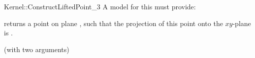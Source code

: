 \begin{ccRefFunctionObjectConcept}{Kernel::ConstructLiftedPoint_3}
A model for this must provide:


       {returns a point  on plane , such that the projection of
        this point onto the $xy$-plane is .}

\ccRefines
{} (with two arguments)

\ccSeeAlso
{} \\

\end{ccRefFunctionObjectConcept}
